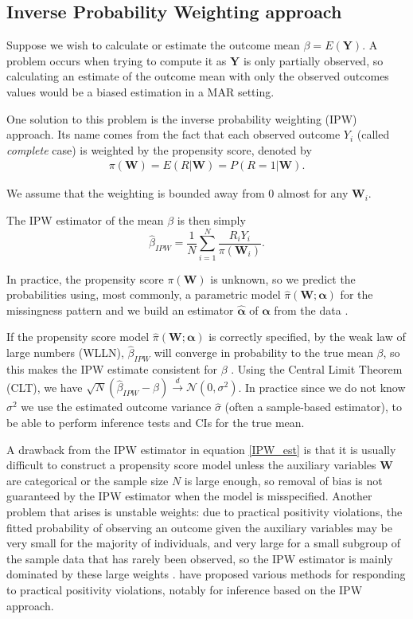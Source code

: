 \documentclass[12pt,twoside]{article}
\begin{document}
\subsection{Inverse Probability Weighting approach}

Suppose we wish to calculate or estimate the outcome mean $\beta = E(\mathbf{Y})$. A problem occurs when trying to compute it as $\mathbf{Y}$ is only partially observed, so calculating an estimate of the outcome mean with only the observed outcomes values would be a biased estimation in a MAR setting.

One solution to this problem is the inverse probability weighting (IPW) approach. Its name comes from the fact that each observed outcome $Y_i$ (called \textit{complete} case) is weighted by the propensity score, denoted by
\begin{align*}
    \pi(\mathbf{W})= E(R|\mathbf{W}) = P(R = 1|\mathbf{W}).
\end{align*}

We assume that the weighting is bounded away from 0 almost for any $\mathbf{W}_i$.

The IPW estimator of the mean $\beta$ is then simply 
\begin{equation} \label{IPW_est}
    \hat{\beta}_{IPW} = \frac{1}{N} \sum_{i=1}^{N} \frac{R_iY_i}{\pi(\mathbf{W}_i)}.
\end{equation}

In practice, the propensity score $\pi(\mathbf{W})$ is unknown, so we predict the probabilities using, most commonly, a parametric model $\hat\pi(\mathbf{W}; \boldsymbol\alpha)$ for the missingness pattern and we build an estimator $\hat{\boldsymbol\alpha}$ of $\boldsymbol\alpha$ from the data \citep{vansteelandt}.

If the propensity score model $\hat\pi(\mathbf{W}; \boldsymbol\alpha)$ is correctly specified, by the weak law of large numbers (WLLN), $\hat{\beta}_{IPW}$ will converge in probability to the true mean $\beta$, so this makes the IPW estimate consistent for $\beta$ \citep{davidian}. Using the Central Limit Theorem (CLT), we have $\sqrt{N}(\hat{\beta}_{IPW}-\beta) \xrightarrow{d} \mathcal{N}(0,\sigma^2)$. In practice since we do not know $\sigma^2$ we use the estimated outcome variance $\hat\sigma$ (often a sample-based estimator), to be able to perform inference tests and CIs for the true mean.

A drawback from the IPW estimator in equation \ref{IPW_est} is that it is usually difficult to construct a propensity score model unless the auxiliary variables $\mathbf{W}$ are categorical or the sample size $N$ is large enough, so removal of bias is not guaranteed by the IPW estimator when the model is misspecified. Another problem that arises is unstable weights: due to practical positivity violations, the fitted probability of observing an outcome given the auxiliary variables may be very small for the majority of individuals, and very large for a small subgroup of the sample data that has rarely been observed, so the IPW estimator is mainly dominated by these large weights \citep{seaman}. \cite{petersen} have proposed various methods for responding to practical positivity violations, notably for inference based on the IPW approach.
\end{document}
